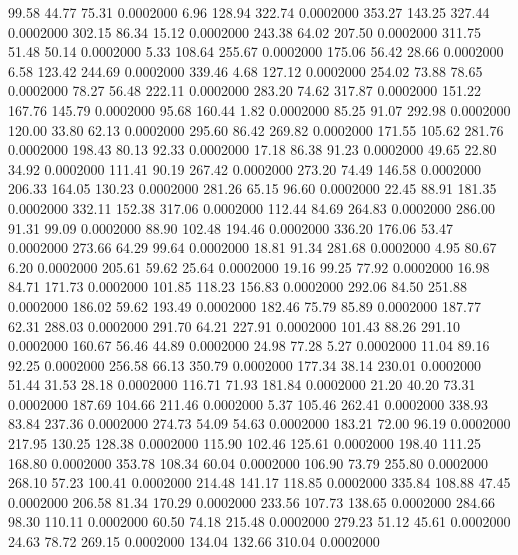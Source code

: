   99.58   44.77   75.31   0.0002000
   6.96  128.94  322.74   0.0002000
 353.27  143.25  327.44   0.0002000
 302.15   86.34   15.12   0.0002000
 243.38   64.02  207.50   0.0002000
 311.75   51.48   50.14   0.0002000
   5.33  108.64  255.67   0.0002000
 175.06   56.42   28.66   0.0002000
   6.58  123.42  244.69   0.0002000
 339.46    4.68  127.12   0.0002000
 254.02   73.88   78.65   0.0002000
  78.27   56.48  222.11   0.0002000
 283.20   74.62  317.87   0.0002000
 151.22  167.76  145.79   0.0002000
  95.68  160.44    1.82   0.0002000
  85.25   91.07  292.98   0.0002000
 120.00   33.80   62.13   0.0002000
 295.60   86.42  269.82   0.0002000
 171.55  105.62  281.76   0.0002000
 198.43   80.13   92.33   0.0002000
  17.18   86.38   91.23   0.0002000
  49.65   22.80   34.92   0.0002000
 111.41   90.19  267.42   0.0002000
 273.20   74.49  146.58   0.0002000
 206.33  164.05  130.23   0.0002000
 281.26   65.15   96.60   0.0002000
  22.45   88.91  181.35   0.0002000
 332.11  152.38  317.06   0.0002000
 112.44   84.69  264.83   0.0002000
 286.00   91.31   99.09   0.0002000
  88.90  102.48  194.46   0.0002000
 336.20  176.06   53.47   0.0002000
 273.66   64.29   99.64   0.0002000
  18.81   91.34  281.68   0.0002000
   4.95   80.67    6.20   0.0002000
 205.61   59.62   25.64   0.0002000
  19.16   99.25   77.92   0.0002000
  16.98   84.71  171.73   0.0002000
 101.85  118.23  156.83   0.0002000
 292.06   84.50  251.88   0.0002000
 186.02   59.62  193.49   0.0002000
 182.46   75.79   85.89   0.0002000
 187.77   62.31  288.03   0.0002000
 291.70   64.21  227.91   0.0002000
 101.43   88.26  291.10   0.0002000
 160.67   56.46   44.89   0.0002000
  24.98   77.28    5.27   0.0002000
  11.04   89.16   92.25   0.0002000
 256.58   66.13  350.79   0.0002000
 177.34   38.14  230.01   0.0002000
  51.44   31.53   28.18   0.0002000
 116.71   71.93  181.84   0.0002000
  21.20   40.20   73.31   0.0002000
 187.69  104.66  211.46   0.0002000
   5.37  105.46  262.41   0.0002000
 338.93   83.84  237.36   0.0002000
 274.73   54.09   54.63   0.0002000
 183.21   72.00   96.19   0.0002000
 217.95  130.25  128.38   0.0002000
 115.90  102.46  125.61   0.0002000
 198.40  111.25  168.80   0.0002000
 353.78  108.34   60.04   0.0002000
 106.90   73.79  255.80   0.0002000
 268.10   57.23  100.41   0.0002000
 214.48  141.17  118.85   0.0002000
 335.84  108.88   47.45   0.0002000
 206.58   81.34  170.29   0.0002000
 233.56  107.73  138.65   0.0002000
 284.66   98.30  110.11   0.0002000
  60.50   74.18  215.48   0.0002000
 279.23   51.12   45.61   0.0002000
  24.63   78.72  269.15   0.0002000
 134.04  132.66  310.04   0.0002000
